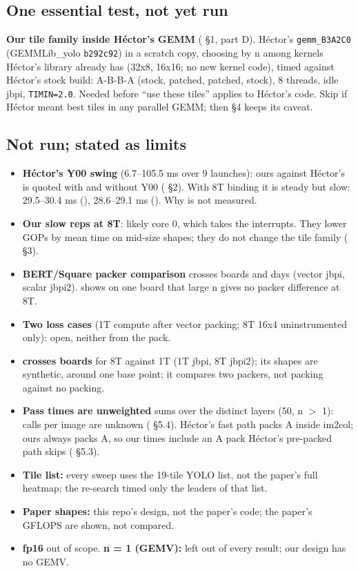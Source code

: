 \subsection*{One essential test, not yet run}
\textbf{Our tile family inside H\'ector's GEMM} ( \S1,  part D). H\'ector's \texttt{gemm\_B3A2C0} (GEMMLib\_yolo \texttt{b292c92}) in a scratch copy, choosing by n among kernels H\'ector's library already has (32x8, 16x16; no new kernel code), timed against H\'ector's stock build: A-B-B-A (stock, patched, patched, stock), 8 threads, idle jbpi, \texttt{TIMIN=2.0}. Needed before ``use these tiles'' applies to H\'ector's code. Skip if H\'ector meant best tiles in any parallel GEMM; then \S4 keeps its caveat.

\subsection*{Not run; stated as limits}
\begin{itemize}\setlength\itemsep{1pt}
\item \textbf{H\'ector's Y00 swing} (6.7--105.5 ms over 9 launches): ours against H\'ector's is quoted with and without Y00 ( \S2). With 8T binding it is steady but slow: 29.5--30.4 ms (), 28.6--29.1 ms (). Why is not measured.
\item \textbf{Our slow reps at 8T}: likely core 0, which takes the interrupts. They lower GOPs by mean time on mid-size shapes; they do not change the tile family ( \S3).
\item \textbf{BERT/Square packer comparison} crosses boards and days (vector jbpi, scalar jbpi2).  shows on one board that large n gives no packer difference at 8T.
\item \textbf{Two  loss cases} (1T compute after vector packing; 8T 16x4 uninstrumented only): open, neither from the pack.
\item \textbf{ crosses boards} for 8T against 1T (1T jbpi, 8T jbpi2); its shapes are synthetic, around one base point; it compares two packers, not packing against no packing.
\item \textbf{Pass times are unweighted} sums over the distinct layers (50, n $>$ 1): calls per image are unknown ( \S5.4). H\'ector's fast path packs A inside im2col; ours always packs A, so our times include an A pack H\'ector's pre-packed path skips ( \S5.3).
\item \textbf{Tile list:} every sweep uses the 19-tile YOLO list, not the paper's full heatmap; the  re-search timed only the leaders of that list.
\item \textbf{Paper shapes:} this repo's design, not the paper's code; the paper's GFLOPS are shown, not compared.
\item \textbf{fp16} out of scope. \textbf{n = 1 (GEMV):} left out of every result; our design has no GEMV.
\end{itemize}
